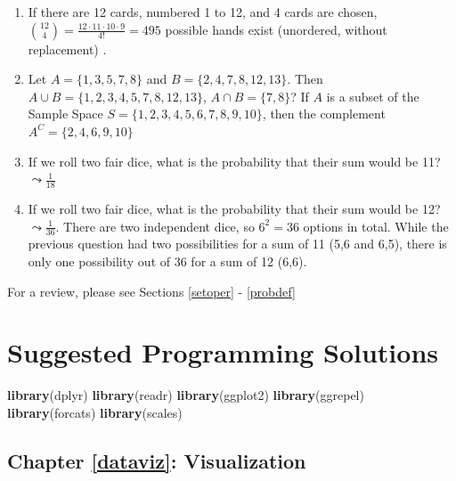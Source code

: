 \documentclass[]{book}
\newenvironment{Shaded}{\begin{snugshade}}{\end{snugshade}}
\newcommand{\KeywordTok}[1]{\textcolor[rgb]{0.13,0.29,0.53}{\textbf{#1}}}
\newcommand{\NormalTok}[1]{#1}
\theoremstyle{definition}
\theoremstyle{definition}
\theoremstyle{definition}
\theoremstyle{remark}
\begin{document}
\begin{Shaded}
\begin{Highlighting}[]
\begin{Shaded}
\begin{Highlighting}[]
\begin{Shaded}
\begin{Highlighting}[]
\begin{enumerate}
\def\labelenumi{\arabic{enumi}.}
\item
  If there are 12 cards, numbered 1 to 12, and 4 cards are chosen, \(\binom{12}{4} = \frac{12\cdot 11\cdot 10\cdot 9}{4!} = 495\) possible hands exist (unordered, without replacement) .
\item
  Let \(A = \{1,3,5,7,8\}\) and \(B = \{2,4,7,8,12,13\}\). Then \(A \cup B = \{1, 2, 3, 4, 5, 7, 8, 12, 13\}\), \(A \cap B = \{7, 8\}\)? If \(A\) is a subset of the Sample Space \(S = \{1,2,3,4,5,6,7,8,9,10\}\), then the complement \(A^C = \{2, 4, 6, 9, 10\}\)
\item
  If we roll two fair dice, what is the probability that their sum would be 11? \(\leadsto \frac{1}{18}\)
\item
  If we roll two fair dice, what is the probability that their sum would be 12? \(\leadsto \frac{1}{36}\). There are two independent dice, so \(6^2 = 36\) options in total. While the previous question had two possibilities for a sum of 11 (5,6 and 6,5), there is only one possibility out of 36 for a sum of 12 (6,6).
\end{enumerate}

For a review, please see Sections \ref{setoper} - \ref{probdef}

\hypertarget{suggested-programming-solutions}{%
\chapter*{Suggested Programming Solutions}\label{suggested-programming-solutions}}

\begin{Shaded}
\begin{Highlighting}[]
\KeywordTok{library}\NormalTok{(dplyr)}
\KeywordTok{library}\NormalTok{(readr)}
\KeywordTok{library}\NormalTok{(ggplot2)}
\KeywordTok{library}\NormalTok{(ggrepel)}
\KeywordTok{library}\NormalTok{(forcats)}
\KeywordTok{library}\NormalTok{(scales)}
\end{Highlighting}
\end{Shaded}

\hypertarget{chapter-refdataviz-visualization}{%
\section{Chapter \ref{dataviz}: Visualization}\label{chapter-refdataviz-visualization}}

\hypertarget{state-proportions}{%
}
\end{Highlighting}
\end{Shaded}
\end{Highlighting}
\end{Shaded}
\end{Highlighting}
\end{Shaded}
\end{document}
